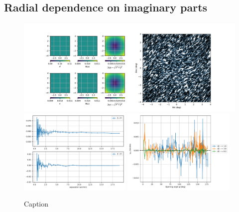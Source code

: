 \subsection{Radial dependence on imaginary parts}

\begin{figure}[h]
\centering
\includegraphics[width=\textwidth]{figs/20230109_radial_imag/coeff_shear.pdf}
\includegraphics[width=0.48\textwidth]{figs/20230109_radial_imag/2point.pdf}
\includegraphics[width=0.48\textwidth]{figs/20230109_radial_imag/3point.pdf}
\caption{Caption}
\label{fig:constant}
\end{figure}
